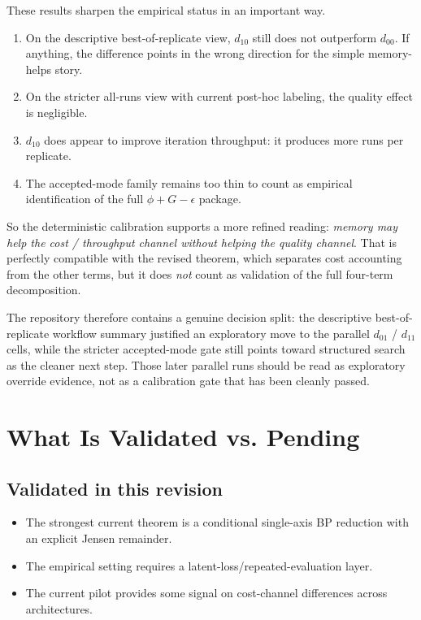 \documentclass[11pt]{article}
\begin{document}
These results sharpen the empirical status in an important way.

\begin{enumerate}
\item On the descriptive best-of-replicate view, $d_{10}$ still does not outperform $d_{00}$.
      If anything, the difference points in the wrong direction for the simple memory-helps story.
\item On the stricter all-runs view with current post-hoc labeling, the quality effect is
      negligible.
\item $d_{10}$ does appear to improve iteration throughput: it produces more runs per replicate.
\item The accepted-mode family remains too thin to count as empirical identification of the full
      $\phi + G - \epsilon$ package.
\end{enumerate}

So the deterministic calibration supports a more refined reading:
\emph{memory may help the cost / throughput channel without helping the quality channel}.
That is perfectly compatible with the revised theorem, which separates cost accounting from the
other terms, but it does \emph{not} count as validation of the full four-term decomposition.

The repository therefore contains a genuine decision split:
the descriptive best-of-replicate workflow summary justified an exploratory move to the parallel
$d_{01}$ / $d_{11}$ cells, while the stricter accepted-mode gate still points toward
structured search as the cleaner next step.
Those later parallel runs should be read as exploratory override evidence, not as a calibration
gate that has been cleanly passed.

\section{What Is Validated vs. Pending}

\subsection*{Validated in this revision}

\begin{itemize}
\item The strongest current theorem is a conditional single-axis BP reduction with an explicit
      Jensen remainder.
\item The empirical setting requires a latent-loss/repeated-evaluation layer.
\item The current pilot provides some signal on cost-channel differences across architectures.
\end{itemize}
\end{document}
